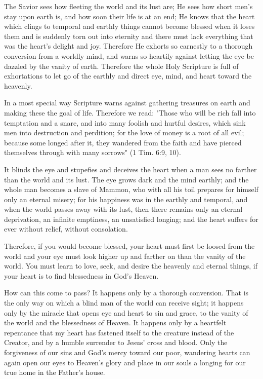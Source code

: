 The Savior sees how fleeting the world and its lust are; He sees how short men’s stay upon earth is, and how soon their life is at an end; He knows that the heart which clings to temporal and earthly things cannot become blessed when it loses them and is suddenly torn out into eternity and there must lack everything that was the heart’s delight and joy. Therefore He exhorts so earnestly to a thorough conversion from a worldly mind, and warns so heartily against letting the eye be dazzled by the vanity of earth. Therefore the whole Holy Scripture is full of exhortations to let go of the earthly and direct eye, mind, and heart toward the heavenly.

In a most special way Scripture warns against gathering treasures on earth and making these the goal of life. Therefore we read: "Those who will be rich fall into temptation and a snare, and into many foolish and hurtful desires, which sink men into destruction and perdition; for the love of money is a root of all evil; because some longed after it, they wandered from the faith and have pierced themselves through with many sorrows" (1 Tim. 6:9, 10).

It blinds the eye and stupefies and deceives the heart when a man sees no farther than the world and its lust. The eye grows dark and the mind earthly; and the whole man becomes a slave of Mammon, who with all his toil prepares for himself only an eternal misery; for his happiness was in the earthly and temporal, and when the world passes away with its lust, then there remains only an eternal deprivation, an infinite emptiness, an unsatisfied longing; and the heart suffers for ever without relief, without consolation.

Therefore, if you would become blessed, your heart must first be loosed from the world and your eye must look higher up and farther on than the vanity of the world. You must learn to love, seek, and desire the heavenly and eternal things, if your heart is to find blessedness in God’s Heaven.

How can this come to pass? It happens only by a thorough conversion. That is the only way on which a blind man of the world can receive sight; it happens only by the miracle that opens eye and heart to sin and grace, to the vanity of the world and the blessedness of Heaven. It happens only by a heartfelt repentance that my heart has fastened itself to the creature instead of the Creator, and by a humble surrender to Jesus’ cross and blood. Only the forgiveness of our sins and God’s mercy toward our poor, wandering hearts can again open our eyes to Heaven’s glory and place in our souls a longing for our true home in the Father’s house.


